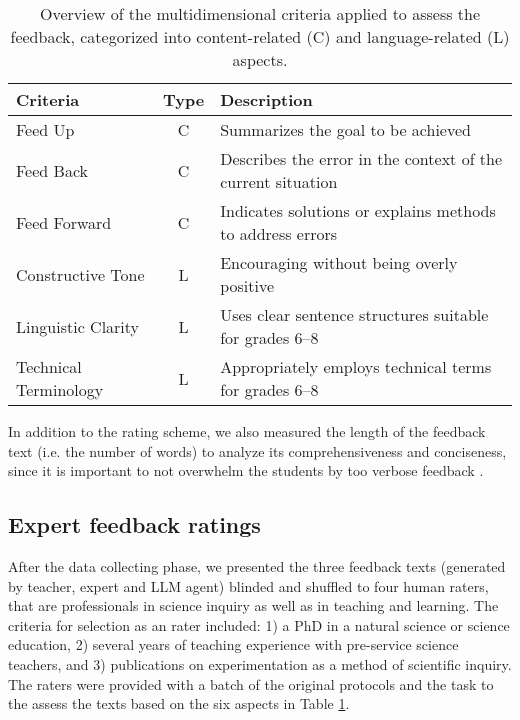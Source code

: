 \begin{table}[htbp]
    \centering
    \caption{Overview of the multidimensional criteria applied to assess the feedback, categorized into content-related (C) and language-related (L) aspects.}
    \label{tab:criteria}
    \begin{tabular}{lcl}
    \toprule
    Criteria & Type & Description  \\
    \midrule
         Feed Up & C & Summarizes the goal to be achieved  \\
         Feed Back & C & Describes the error in the context of the current situation  \\
         Feed Forward & C & Indicates solutions or explains methods to address errors   \\
         Constructive Tone & L & Encouraging without being overly positive  \\
         Linguistic Clarity & L & Uses clear sentence structures suitable for grades 6–8  \\
         Technical Terminology & L & Appropriately employs technical terms for grades 6–8  \\
    \bottomrule
    \end{tabular}
    
\end{table}

In addition to the rating scheme, we also measured the length of the feedback text (i.e. the number of words) to analyze its comprehensiveness and conciseness, since it is important to not overwhelm the students by too verbose feedback \citep{kulhavy1985conjoint}.



\subsection{Expert feedback ratings}

After the data collecting phase, we presented the three feedback texts (generated by teacher, expert and LLM agent) blinded and shuffled to four human raters, that are professionals in science inquiry as well as in teaching and learning. The criteria for selection as an rater included: 1) a PhD in a natural science or science education, 2) several years of teaching experience with pre-service science teachers, and 3) publications on experimentation as a method of scientific inquiry. %
The raters were provided with a batch of the original protocols and the task to the assess the texts based on the six aspects in Table \ref{tab:criteria}. 

